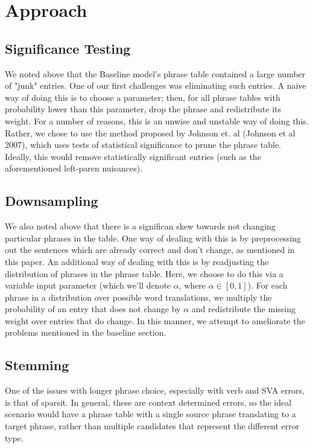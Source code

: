 \documentclass[11pt,letterpaper]{article}
\begin{document}
\section{Approach}
\subsection{Significance Testing}
\indent We noted above that the Baseline model's phrase table contained a large number of "junk" entries.
One of our first challenges was eliminating such entries. A naive way of doing this is to choose a parameter; then, for all 
phrase tables with probability lower than this parameter, drop the phrase and redistribute its weight. For a 
number of reasons, this is an unwise and unstable way of doing this. Rather, we chose to use the method
 proposed by Johnson et. al (Johnson et al 2007), which uses tests of statistical significance to prune the phrase table. 
 Ideally, this would remove statistically significant entries (such as the aforementioned left-paren nuisances). \newline
\subsection{Downsampling}
\indent We also noted above that there is a significan skew towards not changing particular phrases in the table. One way of
 dealing with this is by preprocessing out the sentences which are already correct and don't change, as mentioned in this paper. 
 An additional way of dealing with this is by readjusting the distribution of phrases in the phrase table. Here, we choose to
  do this via a variable input parameter (which we'll denote $\alpha$, where $\alpha \in [0,1]$). For each phrase in
   a distribution over possible word translations, we multiply the probability  of an entry that does not change by $\alpha$ 
   and redistribute the missing weight over entries that do change. In this manner, we attempt to ameliorate the problems 
   mentioned in the baseline section. \newline
\subsection{Stemming}


One of the issues with longer phrase choice, especially with verb and SVA errors, is that of sparsit. In general, these are context determined errors, so the ideal scenario would have a phrase table with a single source phrase translating to a target phrase, rather than multiple candidates that represent the different error type. 
\end{document}
